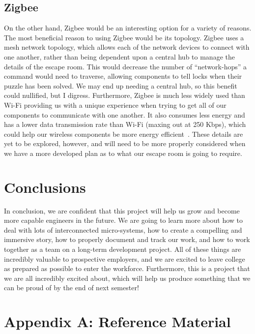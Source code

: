 \documentclass[conference]{IEEEtran}
\begin{document}
\subsection*{Zigbee}
On the other hand, Zigbee would be an interesting option for a variety of reasons. The most beneficial reason to using
Zigbee would be its topology. Zigbee uses a mesh network topology, which allows each of the network devices to connect with
one another, rather than being dependent upon a central hub to manage the details of the escape room. This would decrease
the number of ``network-hops'' a command would need to traverse, allowing components to tell locks when their puzzle has been
solved. We may end up needing a central hub, so this benefit could nullified, but I digress. Furthermore, Zigbee is much less
widely used than Wi-Fi providing us with a unique experience when trying to get all of our components to communicate
with one another. It also consumes less energy and has a lower data transmission rate than Wi-Fi (maxing out at 250 Kbps),
which could help our wireless components be more energy efficient~\cite{wifiVsZigbee}. These details are yet to be explored,
however, and will need to be more properly considered when we have a more developed plan as to what our escape room is going to require.


\section{Conclusions}
In conclusion, we are confident that this project will help us grow and become more capable
engineers in the future. We are going to learn more about how to deal with lots of interconnected
micro-systems, how to create a compelling and immersive story, how to properly document and track
our work, and how to work together as a team on a long-term development project. All of these things
are incredibly valuable to prospective employers, and we are excited to leave college as prepared
as possible to enter the workforce. Furthermore, this is a project that we are all incredibly excited
about, which will help us produce something that we can be proud of by the end of next semester!

\section{Appendix A: Reference Material}
\end{document}
